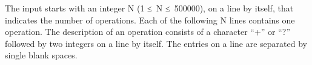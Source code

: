 The input starts with an integer N (1 ≤ N ≤ 500000), on a line by itself, that indicates the number of operations. Each of the following N lines contains one operation. The description of an operation consists of a character “+” or “?” followed by two integers on a line by itself. The entries on a line are separated by single blank spaces.